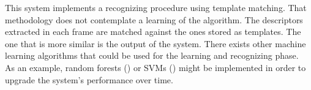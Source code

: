	This system implements a recognizing procedure using template matching. 
	That methodology does not contemplate a learning of the algorithm. 
	The descriptors extracted in each frame are matched against the ones stored as templates. 
	The one that is more similar is the output of the system. 
	There exists other machine learning algorithms that could be used for the learning and recognizing phase. 
	\\

	As an example, random forests (\cite{Gall2012}) or SVMs (\cite{Pontil1998}) might be implemented in order to upgrade the system's performance over time. 
